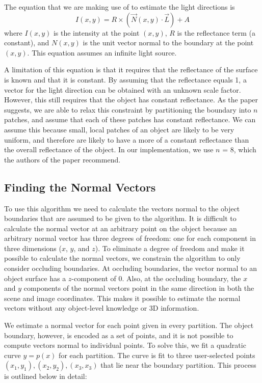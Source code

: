 \documentclass[10pt,twocolumn,letterpaper]{article}
\begin{document}
The equation that we are making use of to estimate the light directions is \[I(x,y) = R\times (\vec{N}(x,y)\cdot \vec{L}) + A\]
where $I(x,y)$ is the intensity at the point $(x,y)$, $R$ is the reflectance term (a constant), and $N(x,y)$ is the unit vector normal to the boundary at the point $(x,y)$. This equation assumes an infinite light source.

A limitation of this equation is that it requires that the reflectance of the surface is known and that it is constant. By assuming that the reflectance equals 1, a vector for the light direction can be obtained with an unknown scale factor. However, this still requires that the object has constant reflectance. As the paper suggests, we are able to relax this constraint by partitioning the boundary into $n$ patches, and assume that each of these patches has constant reflectance. We can assume this because small, local patches of an object are likely to be very uniform, and therefore are likely to have a more of a constant reflectance than the overall reflectance of the object. In our implementation, we use $n$ = 8, which the authors of the paper recommend.

\subsection{Finding the Normal Vectors}
To use this algorithm we need to calculate the vectors normal to the object boundaries that are assumed to be given to the algorithm. It is difficult to calculate the normal vector at an arbitrary point on the object because an arbitrary normal vector has three degrees of freedom: one for each component in three dimensions ($x$, $y$, and $z$). To eliminate a degree of freedom and make it possible to calculate the normal vectors, we constrain the algorithm to only consider occluding boundaries. At occluding boundaries, the vector normal to an object surface has a $z$-component of $0$. Also, at the occluding boundary, the $x$ and $y$ components of the normal vectors point in the same direction in both the scene and image coordinates. This makes it possible to estimate the normal vectors without any object-level knowledge or 3D information. 

We estimate a normal vector for each point given in every partition. The object boundary, however, is encoded as a set of points, and it is not possible to compute vectors normal to individual points. To solve this, we fit a quadratic curve $y = p(x)$ for each partition. The curve is fit to three user-selected points $(x_1,y_1), (x_2,y_2), (x_3,x_3)$ that lie near the boundary partition. This process is outlined below in detail:
\end{document}
